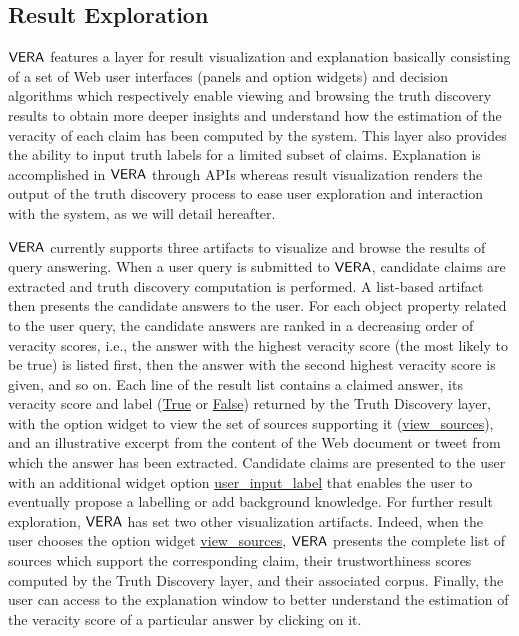 \subsection{Result Exploration}\label{visu}
$\mathsf{VERA}$ features a layer for result visualization and explanation
basically consisting of a set of Web user interfaces (panels and
option widgets) and decision algorithms which respectively enable
 viewing and browsing the truth discovery results 
  to obtain more deeper insights and understand 
how the estimation of the veracity of each claim has been computed
by the system. This layer also provides the ability to input truth
labels for a limited subset of claims. Explanation is accomplished
in $\mathsf{VERA}$ through APIs whereas result visualization
renders the output of the truth discovery process to ease
user exploration and interaction with the system, as we will detail hereafter.


$\mathsf{VERA}$ currently supports three artifacts to visualize
and browse  the results of query answering. When a  user query is submitted to $\mathsf{VERA}$,
candidate claims are extracted and truth discovery computation is performed. 
A list-based artifact then presents the candidate
answers to the user. For each object property 
related to the user query, the candidate answers are ranked
 in a decreasing order of veracity scores, 
 i.e., the answer with the highest veracity score (the most likely to be true) is listed
first, then the answer with the second highest veracity score is given,
and so on. Each  line of the result list contains a claimed
answer, its  veracity score and label (\url{True} or \url{False})
returned by the Truth Discovery layer, with the option widget to view 
the set of sources supporting it (\url{view_sources}), and an illustrative
excerpt from the content of the Web document or tweet from which the answer has
been extracted. Candidate claims are presented to the user with an
additional widget option \url{user_input_label} that enables the user
to eventually propose a labelling or add background knowledge. 
For further result exploration, $\mathsf{VERA}$ 
has set two other visualization artifacts. Indeed, when the user
chooses the option widget \url{view_sources}, $\mathsf{VERA}$  presents the
complete list of sources which support the corresponding claim, their
trustworthiness scores computed by the Truth Discovery layer, and their
associated corpus. Finally, the user can access to the explanation
window to better understand the  estimation of the veracity
score of a particular answer by clicking on it.


